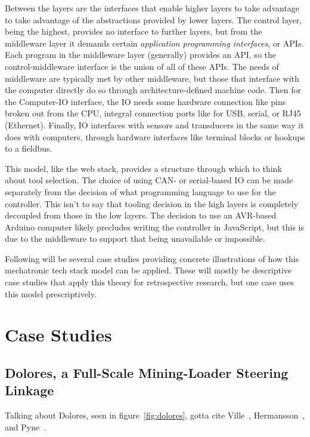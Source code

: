 \documentclass[english,12pt,a4paper,pdftex,eng,utf8]{aaltothesis}
\begin{document}
Between the layers are the interfaces that enable higher layers to take advantage to take advantage of the abstractions provided by lower layers.  The control layer, being the highest, provides no interface to further layers, but from the middleware layer it demands certain {\it application programming interfaces}, or APIs.  Each program in the middleware layer (generally) provides an API, so the control-middleware interface is the union of all of these APIs.  The needs of middleware are typically met by other middleware, but those that interface with the computer directly do so through architecture-defined machine code.  Then for the Computer-IO interface, the IO needs some hardware connection like pins broken out from the CPU, integral connection ports like for USB, serial, or RJ45 (Ethernet).  Finally, IO interfaces with sensors and transducers in the same way it does with computers, through hardware interfaces like terminal blocks or hookups to a fieldbus.

This model, like the web stack, provides a structure through which to think about tool selection.  The choice of using CAN- or serial-based IO can be made separately from the decision of what programming language to use for the controller.  This isn't to say that tooling decision in the high layers is completely decoupled from those in the low layers.  The decision to use an AVR-based Arduino computer likely precludes writing the controller in JavaScript, but this is due to the middleware to support that being unavailable or impossible.

Following will be several case studies providing concrete illustrations of how this mechatronic tech stack model can be applied.  These will mostly be descriptive case studies that apply this theory for retrospective research, but one case uses this model prescriptively.

\clearpage

\section{Case Studies}\label{sec:case_studies}

\lipsum[1-3]

\subsection{Dolores, a Full-Scale Mining-Loader Steering Linkage}

Talking about Dolores, seen in figure~\ref{fig:dolores}, gotta cite Ville~\cite{Naervaenen2022}, Hermansson~\cite{Hermansson2021}, and Pyne~\cite{Pyne2020}.
\end{document}
